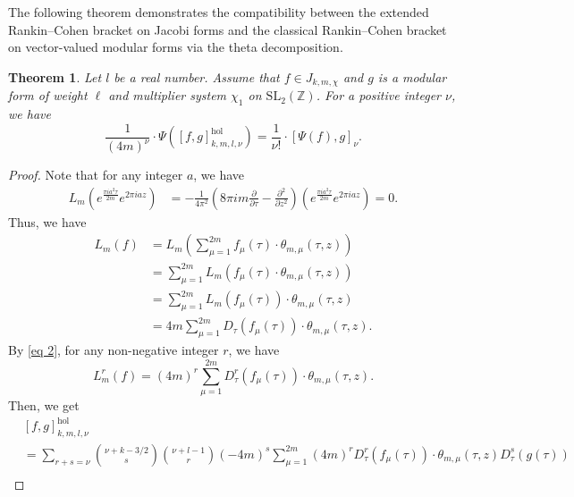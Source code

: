 \documentclass[11pt]{amsart}
\newtheorem{thm}{Theorem}[section]
\theoremstyle{definition}
\theoremstyle{remark}
\numberwithin{equation}{section}
\renewcommand{\(}{\left(}
\renewcommand{\)}{\right)}
\begin{document}
The following theorem demonstrates the compatibility between the extended Rankin–Cohen bracket on Jacobi forms and the classical Rankin–Cohen bracket on vector-valued modular forms via the theta decomposition.

\begin{thm}\label{thm 7}
    Let $l$ be a real number.
    Assume that $f\in J_{k,m,\chi}$ and $g$ is a modular form of weight $\ell$ and multiplier system $\chi_1$ on $\mathrm{SL}_{2}(\mathbb{Z})$. 
    For a positive integer $\nu$, we have 
    \[  \frac{1}{(4m)^{\nu}}\cdot\Psi\left([f,g]^{\mathrm{hol}}_{k,m,l,\nu}\right) = \frac{1}{\nu !}\cdot[\Psi(f),g]_{\nu}. \]
\end{thm}

\begin{proof}
    Note that for any integer $a$, we have 
    \begin{equation*}
        \begin{aligned}
            L_m\left(e^{\frac{\pi i a^2\tau}{2m}}e^{2\pi i a z}\right)&=-\frac{1}{4\pi^2}\left(8\pi i m \frac{\partial}{\partial \tau} - \frac{\partial^2}{\partial z^2}\right)\left(e^{\frac{\pi i a^2\tau}{2m}}e^{2\pi i a z}\right)=0.
        \end{aligned}
    \end{equation*}
    Thus, we have 
    \begin{equation}\label{eq 2}
    \begin{aligned}
        L_m\left(f\right)&=L_m\left(\sum_{\mu=1}^{2m} f_{\mu}(\tau)\cdot \theta_{m,\mu}(\tau,z)\right)\\
        &=\sum_{\mu=1}^{2m} L_m\left(f_{\mu}(\tau)\cdot \theta_{m,\mu}(\tau,z) \right)\\
        &=\sum_{\mu=1}^{2m} L_m\left(f_{\mu}(\tau)\right)\cdot \theta_{m,\mu}(\tau,z)\\
        &=4m \sum_{\mu=1}^{2m} D_{\tau}(f_{\mu}(\tau))\cdot \theta_{m,\mu}(\tau,z).
    \end{aligned}
    \end{equation}
    By \eqref{eq 2}, for any non-negative integer $r$, we have 
    \[ L_m^{r}\left(f\right) = (4m)^{r}\sum_{\mu=1}^{2m} D_{\tau}^{r}(f_{\mu}(\tau))\cdot \theta_{m,\mu}(\tau,z).  \]
    Then, we get 
    \begin{equation*}
        \begin{aligned}
            &[f,g]^{\mathrm{hol}}_{k,m,l,\nu}\\
            &=\sum_{r+s=\nu}\binom{\nu+k-3/2}{s}\binom{\nu+l-1}{r} (-4m)^{s}\sum_{\mu=1}^{2m} (4m)^{r} D_{\tau}^{r}(f_{\mu}(\tau))\cdot \theta_{m,\mu}(\tau,z) D_{\tau}^{s}(g(\tau))\\

\end{aligned}
\end{equation*}
\end{proof}
\end{document}

